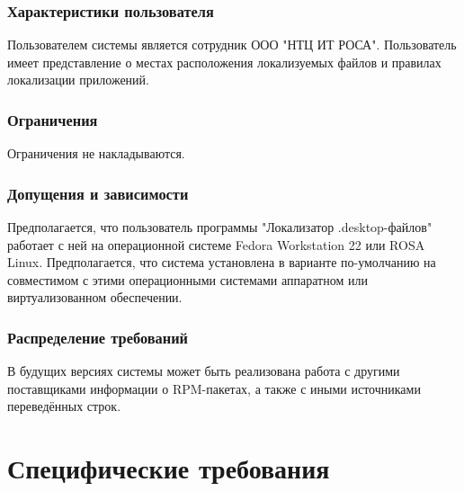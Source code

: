 \documentclass[a4paper,10pt]{report}
\newcommand{\ldf}{"Локализатор .desktop-файлов"}
\newcommand{\rosalab}{ООО "НТЦ ИТ РОСА"}
\newcommand{\rosalinux}{ROSA Linux}
\newcommand{\fedora}{Fedora Workstation 22}
\begin{document}
\subsection{Характеристики пользователя}
Пользователем системы является сотрудник \rosalab. Пользователь имеет представление о местах расположения локализуемых файлов и правилах локализации приложений.

\subsection{Ограничения}
Ограничения не накладываются.

\subsection{Допущения и зависимости}
Предполагается, что пользователь программы 	{\ldf} работает с ней на операционной системе {\fedora} или \rosalinux. Предполагается, что система установлена в варианте по-умолчанию на совместимом с этими операционными системами аппаратном или виртуализованном обеспечении.

\subsection{Распределение требований}
В будущих версиях системы может быть реализована работа с другими поставщиками информации о RPM-пакетах, а также с иными источниками переведённых строк.

\chapter{Специфические требования}
\end{document}
